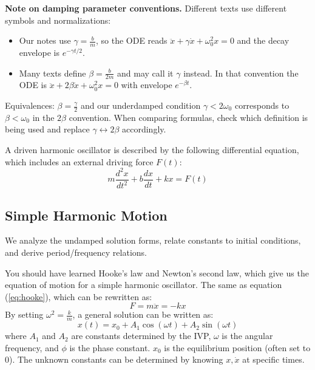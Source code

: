 \documentclass[11pt]{report}
\begin{document}
\begin{shaded}
	\textbf{Note on damping parameter conventions.} Different texts use different symbols and normalizations:
\begin{itemize}
    \item Our notes use $\gamma = \tfrac{b}{m}$, so the ODE reads $\ddot{x} + \gamma\dot{x} + \omega_0^2 x = 0$ and the decay envelope is $e^{-\gamma t/2}$.
    \item Many texts define $\beta = \tfrac{b}{2m}$ and may call it $\gamma$ instead. In that convention the ODE is $\ddot{x} + 2\beta\dot{x} + \omega_0^2 x = 0$ with envelope $e^{-\beta t}$.
\end{itemize}
Equivalences: $\beta = \tfrac{\gamma}{2}$ and our underdamped condition $\gamma < 2\omega_0$ corresponds to $\beta < \omega_0$ in the $2\beta$ convention. When comparing formulas, check which definition is being used and replace $\gamma \leftrightarrow 2\beta$ accordingly.
\end{shaded}

\begin{definition}
    A driven harmonic oscillator is described by the following differential equation, which includes an external driving force $F(t)$:
    \begin{equation}
        m \frac{d^2 x}{dt^2} + b \frac{dx}{dt} + kx = F(t)   
    \end{equation}
\end{definition}

\subsection{Simple Harmonic Motion}
We analyze the undamped solution forms, relate constants to initial conditions, and derive period/frequency relations.
\begin{definition}
    You should have learned Hooke's law and Newton's second law, which give us the equation of motion for a simple harmonic oscillator. The same as equation (\ref{eq:hooke}), which can be rewritten as:
    \begin{equation}
        F = m\ddot{x} = -kx
    \end{equation}
    By setting $\omega^2 = \frac{k}{m}$, a general solution can be written as:
    \begin{equation}
        x(t) = x_0 + A_1 \cos(\omega t) + A_2 \sin(\omega t)
    \end{equation}
    where $A_1$ and $A_2$ are constants determined by the IVP, $\omega$ is the angular frequency, and $\phi$ is the phase constant. $x_0$ is the equilibrium position (often set to 0). The unknown constants can be determined by knowing $x, \dot{x}$ at specific times.
\end{definition}
\end{document}
